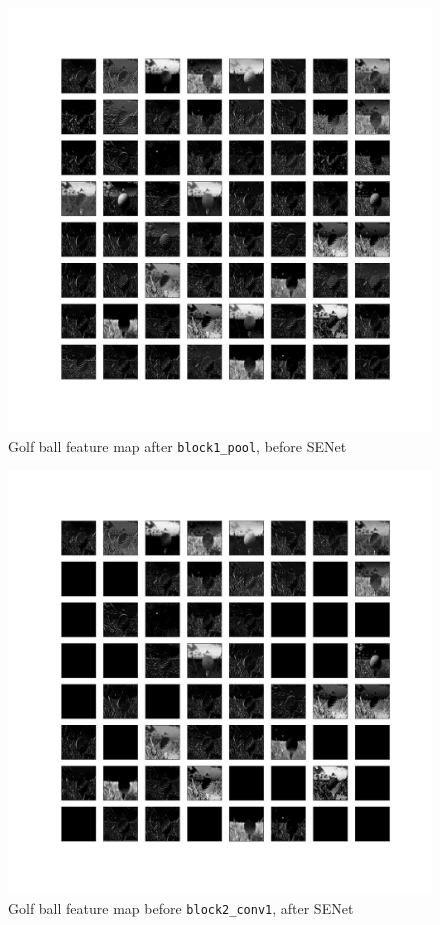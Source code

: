 \documentclass{article}
\begin{document}
\begin{figure}[H]
    \centering
    \includegraphics[width=6in]{csci-8110/hw-3/images/golf-pre-SENet-block1_pool-2020-11-06 02_39_48.350774_output.png}
    \caption{Golf ball feature map after \lstinline{block1_pool}, before SENet}
    \label{fig:golf_1_pre}
\end{figure}

\begin{figure}[H]
    \centering
    \includegraphics[width=6in]{csci-8110/hw-3/images/golf-post-SENet-block1_pool-2020-11-06 02_39_51.127362_output.png}
    \caption{Golf ball feature map before \lstinline{block2_conv1}, after SENet}
    \label{fig:golf_1_post}
\end{figure}
\end{document}
